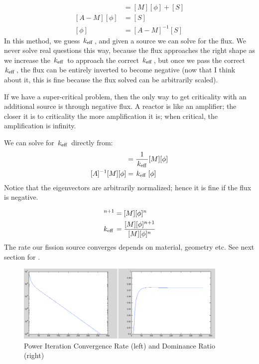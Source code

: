 \documentclass{school-22.211-notes}
\begin{document}
\begin{align}
[A] [\phi] &= [M] [\phi] + [S] \\
[A - M ] [\phi] &= [S] \\
[\phi] &= [A - M]^{-1} [S]
\end{align}
In this method, we guess $\left. k_{\mathrm{eff}} \right.$, and given a source we can solve for the flux. We never solve real questions this way, because the flux approaches the right shape as we increase the $\left. k_{\mathrm{eff}} \right.$ to approach the correct $\left. k_{\mathrm{eff}} \right.$, but once we pass the correct $\left. k_{\mathrm{eff}} \right.$, the flux can be entirely inverted to become negative (now that I think about it, this is fine because the flux solved can be arbitrarily scaled). 

If we have a super-critical problem, then the only way to get criticality with an additional source is through negative flux. A reactor is like an amplifier; the closer it is to criticality the more amplification it is; when critical, the amplification is infinity. 


We can solve for $\left. k_{\mathrm{eff}} \right.$ directly from: 
\begin{align}
[A] [\phi] &= \frac{1}{\keff} [M] [\phi] \\
[A]^{-1} [M] [\phi] &= \keff [\phi]
\end{align}
Notice that the eigenvectors are arbitrarily normalized; hence it is fine if the flux is negative. 


\begin{align}
[A] [\phi]^{n+1} &= [M] [\phi]^n \\
\keff &= \frac{[M][\phi]^{n+1} }{[M] [\phi]^n} 
\end{align}
The rate our fission source converges depends on material, geometry etc. See next section for . 
\begin{figure}
  \centering
  \includegraphics[width=4in]{images/dfs/power-iteration-convergence.png}
  \caption{Power Iteration Convergence Rate (left) and Dominance Ratio (right)}
\end{figure}
\end{document}
